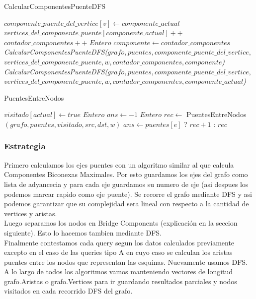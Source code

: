 \begin{algorithm}[]
    \caption{CalcularComponentesPuenteDFS}
    $componente\_puente\_del\_vertice[v] \gets componente\_actual$ \;
    $vertices\_del\_componente\_puente[componente\_actual]++$ \;
     {
    	 {
			 {
				$contador\_componentes++$ \;
				$Entero$ $componente \gets contador\_componentes$ \;
				\emph{CalcularComponentesPuenteDFS($grafo, puentes, componente\_puente\_del\_vertice,$ 
				$vertices\_del\_componente\_puente, w, contador\_componentes, componente$)} \;
			}{
				\emph{CalcularComponentesPuenteDFS($grafo, puentes, componente\_puente\_del\_vertice,$ 
				$vertices\_del\_componente\_puente, w, contador\_componentes, componente\_actual$)}
			}
		}
    }
\end{algorithm}

\begin{algorithm}[H]
    \caption{PuentesEntreNodos}
    $visitado[actual] \gets true$ \;
     {
    }
    $Entero$ $ans \gets -1$ \;
     {
    	 {
			$Entero$ $rec \gets$ PuentesEntreNodos$(grafo, puentes, visitado, src, dst, w)$ \;
			 {
				$ans \gets puentes[e]$ ? $rec+1$ : $rec$
			}
		}
    }
\end{algorithm}

\subsubsection*{Estrategia}

Primero calculamos los ejes puentes con un algoritmo similar al que calcula Componentes Biconexas Maximales. Por esto
guardamos los ejes del grafo como lista de adyancecia y para cada eje guardamos su numero de eje (asi despues los podemos
marcar rapido como eje puente). Se recorre el grafo mediante DFS y asi podemos garantizar que su complejidad sera lineal 
con respecto a la cantidad de vertices y aristas. \\
Luego separamos los nodos en Bridge Components (explicación en la seccion siguiente). Esto lo hacemos tambien mediante DFS. \\
Finalmente contestamos cada query segun los datos calculados previamente excepto en el caso de las queries tipo A en cuyo caso 
se calculan los aristas puentes entre los nodos que representan las esquinas. Nuevamente usamos DFS. \\
A lo largo de todos los algoritmos vamos manteniendo vectores de longitud grafo.Aristas o grafo.Vertices para ir guardando resultados
parciales y nodos visitados en cada recorrido DFS del grafo. \\

